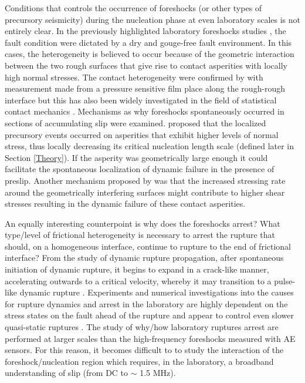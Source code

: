 \documentclass[preprint,1p, 10pt,authoryear]{elsarticle}
\begin{document}
Conditions that controls the occurrence of foreshocks (or other types of precursory seismicity) during the nucleation phase at even laboratory scales is not entirely clear. In the previously highlighted laboratory foreshocks studies \citep{McLaskey2013, Selvadurai2015}, the fault condition were dictated by a dry and gouge-free fault environment.  In this cases, the heterogeneity is believed to occur because of the geometric interaction between the two rough surfaces that give rise to contact asperities with locally high normal stresses.  The contact heterogeneity were confirmed by \citet{Selvadurai2017} with measurement made from a pressure sensitive film place along the rough-rough interface but this has also been widely investigated in the field of statistical contact mechanics \citep[e.g.][]{Johnson1985, Persson2006}. Mechanisms as why foreshocks spontaneously occurred in sections of accumulating slip were examined.  \citet{Selvadurai2017} proposed that the localized precursory events occurred on asperities that exhibit higher levels of normal stress, thus locally decreasing its critical nucleation length scale (defined later in Section \ref{Theory}). If the asperity was geometrically large enough it could facilitate the spontaneous localization of dynamic failure in the presence of preslip. Another mechanism proposed by \citet{McLaskey2013} was that the increased stressing rate around the geometrically interfering surfaces might contribute to higher shear stresses resulting in the dynamic failure of these contact asperities.  

An equally interesting counterpoint is why does the foreshocks arrest? What type/level of frictional heterogeneity is necessary to arrest the rupture that should, on a homogeneous interface, continue to rupture to the end of frictional interface? From the study of dynamic rupture propagation, after spontaneous initiation of dynamic rupture, it begins to expand in a crack-like manner, accelerating outwards to a critical velocity, whereby it may transition to a pulse-like dynamic rupture \citep{Heaton1990, Meier2016}. Experiments and numerical investigations into the causes for rupture dynamics and arrest in the laboratory are highly dependent on the stress states on the fault ahead of the rupture \citep{Rubinstein2004, Ben-David2010, Fineberg2015, Maegawa2010, Tromborg2011, Kammer2012, Otsuki2013, Kammer2015, Albertini2020} and appear to control even slower quasi-static ruptures \citep{Selvadurai2017a}. The study of why/how laboratory ruptures arrest are performed at larger scales than the high-frequency foreshocks measured with AE sensors. For this reason, it becomes difficult to to study the interaction of the foreshock/nucleation region which requires, in the laboratory, a broadband understanding of slip (from DC to $\sim$ 1.5 MHz). 
\end{document}
